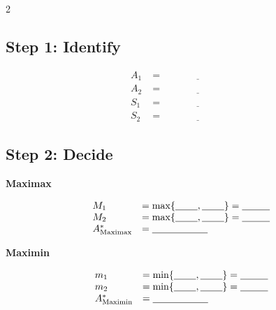 \begin{multicols}{2}
		\subsection*{Step 1: Identify}
		\[
		\begin{array}{ll}
			A_1 &= \underline{\hspace{3cm}} \\
			A_2 &= \underline{\hspace{3cm}} \\
			S_1 &= \underline{\hspace{3cm}} \\
			S_2 &= \underline{\hspace{3cm}}
		\end{array}
		\]
		
		\subsection*{Step 2: Decide}
		
		\textbf{Maximax}
		
		\[
		\begin{array}{ll}
			M_1 &= \max\{\underline{\hspace{0.8cm}},\underline{\hspace{0.8cm}}\}
			=\underline{\hspace{1cm}} \\
			M_2 &= \max\{\underline{\hspace{0.8cm}},\underline{\hspace{0.8cm}}\}
			=\underline{\hspace{1cm}} \\
			A^*_{\mathrm{Maximax}} &= \underline{\hspace{2cm}}
		\end{array}
		\]
		
		\textbf{Maximin}
		
		\[
		\begin{array}{ll}
			m_1 &= \min\{\underline{\hspace{0.8cm}},\underline{\hspace{0.8cm}}\}
			=\underline{\hspace{1cm}} \\
			m_2 &= \min\{\underline{\hspace{0.8cm}},\underline{\hspace{0.8cm}}\}
			=\underline{\hspace{1cm}} \\
			A^*_{\mathrm{Maximin}} &= \underline{\hspace{2cm}}
		\end{array}
		\]
		

\end{multicols}
